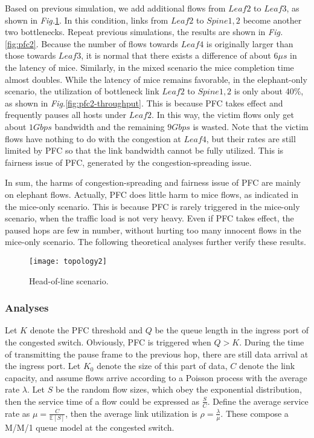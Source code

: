 \documentclass[]{sig-alternate-10pt}
\begin{document}
Based on previous simulation, we add additional flows from $Leaf2$ to $Leaf3$, as shown in \emph{Fig.}\ref{fig:topology2}.
In this condition, links from $Leaf2$ to $Spine1,2$ become another two bottlenecks.
Repeat previous simulations, the results are shown in \emph{Fig.}\ref{fig:pfc2}.
Because the number of flows towards $Leaf4$ is originally larger than those towards $Leaf3$, it is normal that there exists a difference of about 6$\mu s$ in the latency of mice.
Similarly, in the mixed scenario the mice completion time almost doubles.
While the latency of mice remains favorable, in the elephant-only scenario, the utilization of bottleneck link $Leaf2$ to $Spine1,2$ is only about 40\%, as shown in \emph{Fig.}\ref{fig:pfc2-throughput}.
This is because PFC takes effect and frequently pauses all hosts under $Leaf2$.
In this way, the victim flows only get about $1Gbps$ bandwidth and the remaining $9Gbps$ is wasted.
Note that the victim flows have nothing to do with the congestion at $Leaf4$, but their rates are still limited by PFC so that the link bandwidth cannot be fully utilized.
This is fairness issue of PFC, generated by the congestion-spreading issue.


In sum, the harms of congestion-spreading and fairness issue of PFC are mainly on elephant flows. Actually, PFC does little harm to mice flows, as indicated in the mice-only scenario. This is because PFC is rarely triggered in the mice-only scenario, when the traffic load is not very heavy. Even if PFC takes effect, the paused hops are few in number, without hurting too many innocent flows in the mice-only scenario. The following theoretical analyses further verify these results.

\begin{figure}[t]
	\centering
	\texttt{[image: topology2]}
	\caption{Head-of-line scenario.}
	\label{fig:topology2}
\end{figure}


\subsubsection{Analyses}

Let $K$ denote the PFC threshold and $Q$ be the queue length in the ingress port of the congested switch. Obviously, PFC is triggered when $Q>K$. During the time of transmitting the pause frame to the previous hop, there are still data arrival at the ingress port. Let $K_0$ denote the size of this part of data, $C$ denote the link capacity, and assume flows arrive according to a Poisson process with the average rate $\lambda$. Let $S$ be the random flow sizes, which obey the exponential distribution, then the service time of a flow could be expressed as $\frac{S}{C}$.
Define the average service rate as $\mu=\frac{C}{\mathbb{E}[S]}$, then the average link utilization is $\rho=\frac{\lambda}{\mu}$. These compose a M/M/1 queue model at the congested switch.
\end{document}
